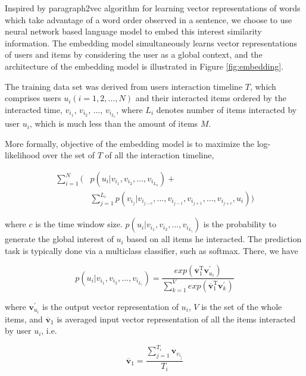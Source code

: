 \documentclass{sig-alternate-05-2015}
\begin{document}
Inspired by paragraph2vec algorithm \cite{le2014distributed} for learning
vector representations of words which take advantage of
a word order observed in a sentence,
we choose to use neural network based language model
to embed this interest similarity information.
The embedding model simultaneously learns vector representations of users and items
by considering the user as a global context,
and the architecture of the embedding model is illustrated in Figure \ref{fig:embedding}.

The training data set was derived from users interaction timeline $T$,
which comprises users $u_i (i=1,2,...,N)$ and their interacted items ordered by the interacted time,
$v_{i_1}$, $v_{i_2}$, ..., $v_{i_{L_i}}$,
where $L_i$ denotes number of items interacted by user $u_i$,
which is much less than the amount of items $M$.

More formally, objective of the embedding model is to
maximize the log-likelihood over the set of $T$ of all the interaction timeline,

\begin{equation}
\begin{aligned}
	\sum_{i=1}^{N} \bigg( &p(u_i | v_{i_1}, v_{i_2}, ..., v_{i_{L_n}}) + \\
	                      &\sum_{j=1}^{L_i} p(v_{i_j} | v_{i_{j-c}}, ..., v_{i_{j-1}}, v_{i_{j+1}},..., v_{i_{j+c}}, u_i) \bigg)
\end{aligned}
\end{equation}

where $c$ is the time window size.
$p(u_i | v_{i_1}, v_{i_2}, ..., v_{i_{L_i}})$ is the probability to generate
the global interest of $u_i$ based on all items he interacted.
The prediction task is typically done via a multiclass classifier,
such as softmax. There, we have

\begin{equation}
	p(u_i | v_{i_1}, v_{i_2}, ..., v_{i_{L_i}}) =
	\frac
	{
		exp ( \overline{\mathbf{v}}_{1}^{\mathrm{T}} \mathbf{v}_{u_i}^{'} )
	}
	{
		\sum_{k=1}^{V} exp ( \overline{\mathbf{v}}_{1}^{\mathrm{T}} \mathbf{v}_{k}^{'} )
	}
\end{equation}

where $\mathbf{v}_{u_i}^{'}$ is the output vector representation of $u_i$,
$V$ is the set of the whole items,
and $\overline{\mathbf{v}}_{1}$ is averaged input vector representation of all the items
interacted by user $u_i$, i.e.

\begin{equation}
	\overline{\mathbf{v}}_{1} = \frac{\sum_{j=1}^{T_i} \mathbf{v}_{v_{i_j}}}{T_i}
\end{equation}
\end{document}
